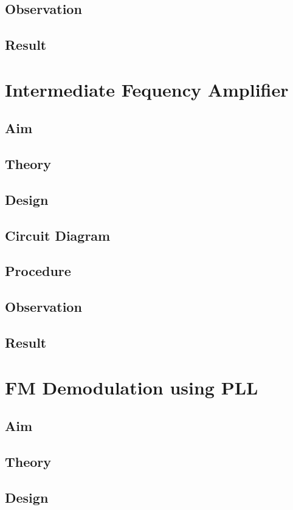 \documentclass{book}
\begin{document}
\section*{Observation}
\section*{Result}

\chapter[Intermediate Fequency Amplifier]{Intermediate Fequency Amplifier}
\section*{Aim}
\section*{Theory}
\section*{Design}
\section*{Circuit Diagram}
\section*{Procedure}
\section*{Observation}
\section*{Result}

\chapter[FM Demodulation using PLL]{FM Demodulation using PLL}
\section*{Aim}
\section*{Theory}
\section*{Design}
\end{document}
